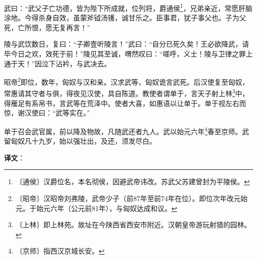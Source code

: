 \documentclass[12pt,UTF-8,openany,a4]{ctexbook}
\begin{document}
\begin{large}
    武曰：“武父子亡功德，皆为陛下所成就，位列将，爵通侯\footnote{〔通侯〕\yiwen 汉爵位名，本名彻侯，因避武帝讳改。苏武父苏建曾封为平陵侯。}，兄弟亲近，常愿肝脑涂地。今得杀身自效，虽蒙斧钺汤镬，诚甘乐之。臣事君，犹子事父也。子为父死，亡所恨，愿无复再言！”
    
    陵与武饮数日，复曰：“子卿壹听陵言！”武曰：“自分已死久矣！王必欲降武，请毕今日之欢，效死于前！”陵见其至诚，喟然叹曰：“嗟呼，义士！陵与卫律之罪上通于天！”因泣下沾衿，与武决去。
    
    昭帝\footnote{〔昭帝〕\yiwen 汉昭帝刘弗陵，武帝少子（前87年至前74年在位）。即位次年改元始元。于始元六年（公元前81年），与匈奴达成和议。}即位，数年，匈奴与汉和亲。汉求武等，匈奴诡言武死。后汉使复至匈奴，常惠请其守者与俱，得夜见汉使，具自陈道。教使者谓单于，言天子射上林\footnote{〔上林〕\yiwen 即上林苑。故址在今陕西省西安市附近。汉朝皇帝游玩射猎的园林。}中，得雁足有系帛书，言武等在荒泽中。使者大喜，如惠语以让单于。单于视左右而惊，谢汉使曰：“武等实在。”
    
    单于召会武官属，前以降及物故，凡随武还者九人。武以始元六年\footnote{〔京师〕\yiwen 指西汉京城长安。}春至京师。武留匈奴凡十九岁，始以强壮出，及还，须发尽白。

\end{large}


\newpage

\begin{Large}
   \noindent \textbf{译文}：
\end{Large}

\vspace{1em}
\end{document}

